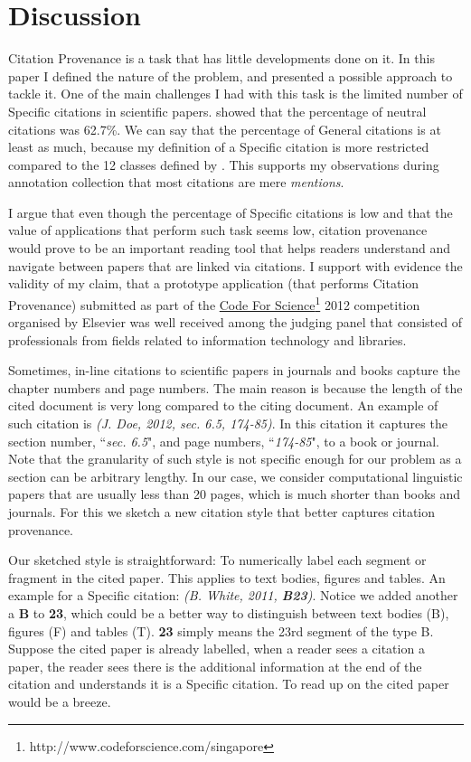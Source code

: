 \chapter{Discussion}
\label{discussion}
Citation Provenance is a task that has little developments done on it. In this paper I defined the nature of the problem, and presented a possible approach to tackle it. One of the main challenges I had with this task is the limited number of Specific citations in scientific papers.  showed that the percentage of neutral citations was 62.7\%. We can say that the percentage of General citations is at least as much, because my definition of a Specific citation is more restricted compared to the 12 classes defined by . This supports my observations during annotation collection that most citations are mere {\it mentions}.

I argue that even though the percentage of Specific citations is low and that the value of applications that perform such task seems low, citation provenance would prove to be an important reading tool that helps readers understand and navigate between papers that are linked via citations. I support with evidence the validity of my claim, that a prototype application (that performs Citation Provenance) submitted as part of the \url{Code For Science}\footnote{http://www.codeforscience.com/singapore} 2012 competition organised by Elsevier was well received among the judging panel that consisted of professionals from fields related to information technology and libraries.

Sometimes, in-line citations to scientific papers in journals and books capture the chapter numbers and page numbers. The main reason is because the length of the cited document is very long compared to the citing document. An example of such citation is \textit{(J. Doe, 2012, sec. 6.5, 174-85)}. In this citation it captures the section number, ``\textit{sec. 6.5}", and page numbers, ``\textit{174-85}", to a book or journal. Note that the granularity of such style is not specific enough for our problem as a section can be arbitrary lengthy. In our case, we consider computational linguistic papers that are usually less than 20 pages, which is much shorter than books and journals. For this we sketch a new citation style that better captures citation provenance.

Our sketched style is straightforward: To numerically label each segment or fragment in the cited paper. This applies to text bodies, figures and tables. An example for a Specific citation: \textit{(B. White, 2011, \textbf{B23})}. Notice we added another a \textbf{B} to \textbf{23}, which could be a better way to distinguish between text bodies (B), figures (F) and tables (T). \textbf{23} simply means the 23rd segment of the type B. Suppose the cited paper is already labelled, when a reader sees a citation a paper, the reader sees there is the additional information at the end of the citation and understands it is a Specific citation. To read up on the cited paper would be a breeze.